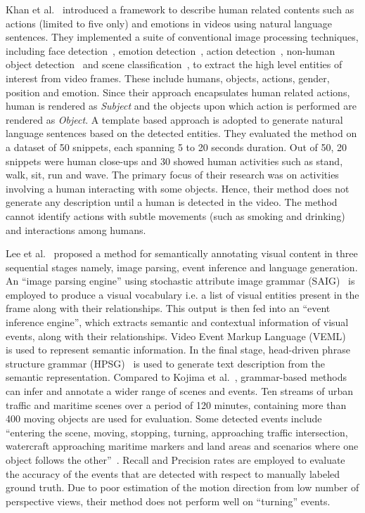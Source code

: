 \documentclass[10pt,journal,compsoc]{IEEEtran}
\begin{document}
Khan et al.~\cite{khan2011human} introduced a framework to describe human related contents such as actions (limited to five only) and emotions in videos using natural language sentences. They implemented a suite of conventional image processing techniques, including face detection~\cite{kuchi2002human}, emotion detection~\cite{maglogiannis2009face}, action detection~\cite{bobick1997state}, non-human object detection~\cite{viola2001rapid} and scene classification~\cite{kim2010novel}, to extract the high level entities of interest from video frames. These include humans, objects, actions, gender, position and emotion. Since their approach encapsulates human related actions, human is rendered as \textit{Subject} and the objects upon which action is performed are rendered as \textit{Object}. A template based approach is adopted to generate natural language sentences based on the detected entities. They evaluated the method on a dataset of 50 snippets, each spanning 5 to 20 seconds duration. Out of 50, 20 snippets were human close-ups and 30 showed human activities such as stand, walk, sit, run and wave. The primary focus of their research was on activities involving a human interacting with some objects. Hence, their method does not generate any  description until a human is detected in the video. The method cannot identify actions with subtle movements (such as smoking and drinking) and interactions among humans.


\vspace{2mm}
 Lee et al.~\cite{lee2008save} proposed a method for semantically annotating visual content in three sequential stages namely, image parsing, event inference and language generation. An ``image parsing engine'' using  stochastic attribute image grammar (SAIG)~\cite{zhu2007stochastic} is employed to produce a visual vocabulary i.e. a list of visual entities present in the frame along with their relationships. This output is then fed into an ``event inference engine'', which extracts semantic and contextual information of visual events, along with their relationships. Video Event Markup Language (VEML)~\cite{nevatia2004ontology} is used to represent semantic information. In the final stage, head-driven phrase structure grammar (HPSG)~\cite{pollard1994head} is used to generate text description from the semantic representation. Compared to Kojima et al.~\cite{kojima2002natural}, grammar-based methods can infer and annotate a wider range of scenes and events. Ten streams of urban traffic and maritime scenes over a period of 120 minutes, containing more than 400 moving objects are used for evaluation. Some detected events include ``entering  the scene, moving, stopping, turning, approaching traffic intersection, watercraft approaching maritime markers and land areas and scenarios where one object follows the other''~\cite{lee2008save}. Recall and Precision rates are employed to evaluate the accuracy of the events that are detected with respect to manually labeled ground truth. Due to poor estimation of the motion direction from low number of perspective views, their method does not perform well on ``turning'' events.
\end{document}
